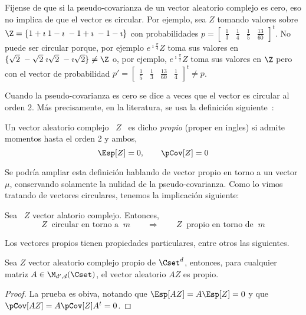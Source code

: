Fijense de que si la pseudo-covarianza  de un vector aleatorio complejo es cero,
eso  no implica de  que el  vector es  circular.  Por  ejemplo, sea  $Z$ tomando
valores sobre  $\Z = \{ 1+\imath \;  1-\imath \; -1+\imath \;  -1-\imath \}$ con
probabilidades   $p  =   \begin{bmatrix}   \frac13  &   \frac14   &  \frac15   &
  \frac{13}{60}  \end{bmatrix}^t$. No  puede  ser circular  porque, por  ejemplo
$e^{\imath \frac{\pi}{4}} Z$ toma sus valores en $\{ \sqrt2 \; -\sqrt2 \; \imath
\sqrt2 \; -\imath \sqrt2 \} \ne \Z$ o, por ejemplo, $e^{\imath \frac{\pi}{2}} Z$
toma   sus  valores   en  $\Z$   pero  con   el  vector   de   probabilidad  $p'
= \begin{bmatrix} \frac15 & \frac13 & \frac{13}{60} & \frac14\end{bmatrix}^t \ne
p$.

Cuando la pseudo-covarianza es cero se dice a veces que el vector es circular al
orden  2.  M\'as  precisamente,  en   la  literatura,  se  usa  la  definici\'on
siguiente~\cite[Def.~17.4.1]{Lap17}:
%
\begin{definicion}\label{Def:MP:VectorAleatorioComplejoPropio}
%
  Un vector aleatorio complejo \ $Z$  \ es dicho {\em propio} (proper en ingles)
  si admite momentos hasta el orden 2 y ambos,
  \[
  \Esp[Z] = 0, \qquad \pCov[Z] = 0
  \]
\end{definicion}
%
Se podr\'ia ampliar  esta definici\'on hablando de vector propio  en torno a un
vector $\mu$, conservando solamente la  nulidad de la pseudo-covarianza. Como lo
vimos tratando de vectores circulares, tenemos la implicaci\'on siguiente:

\begin{teorema}[Circularidad]
\label{Teo:MP:Circularidad}
%
  Sea   \   $Z$ vector alatorio complejo.  Entonces,
%
  \[
  Z \:  \mbox{ circular en torno  a } \:  m \qquad \Longrightarrow \qquad  Z \:
  \mbox{ propio en torno de } \: m
  \]
\end{teorema}

Los vectores propios tienen  propiedades particulares, entre otros las siguientes.

\begin{teorema}\label{Teo:MP:PropioLineal}
%
  Sea  $Z$  vector  aleatorio  complejo  propio  de  $\Cset^d$,  entonces,  para
  cualquier matriz $A \in \M_{d',d}(\Cset)$, el vector aleatorio $A Z$ es propio.
\end{teorema}
\begin{proof}
  La prueba es obiva, notando que $\Esp[A Z]  = A \Esp[Z] = 0$ y que $\pCov[A Z]
  = A \pCov[Z] A^t = 0$.
\end{proof}


